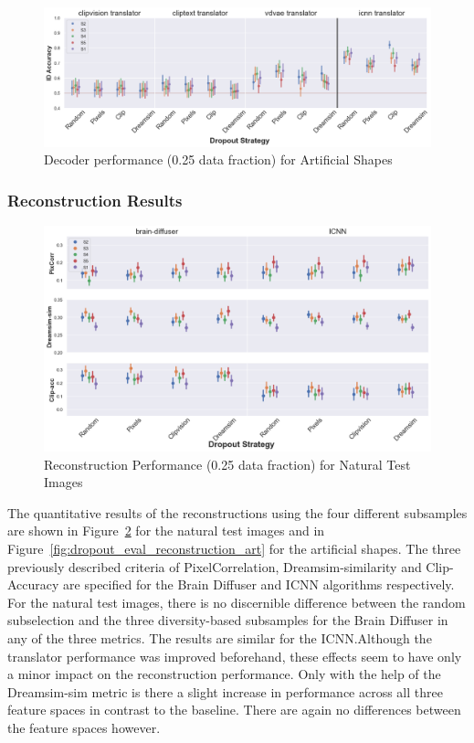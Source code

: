 \begin{figure}[ht]
  \centering
  \includegraphics[width=1\textwidth]{plots/dropout_eval_translator_art.png}
  \caption{Decoder performance (0.25 data fraction) for Artificial Shapes}\label{fig:dropout_eval_translator_art}
\end{figure}


\subsubsection{Reconstruction Results}

\begin{figure}[ht]
  \centering
  \includegraphics[width=1\textwidth]{plots/dropout_eval_reconstruction_test.png}
  \caption{Reconstruction Performance (0.25 data fraction) for Natural Test Images}\label{fig:dropout_eval_reconstruction_test}
\end{figure}

The quantitative results of the reconstructions using the four different subsamples are shown in Figure~\ref{fig:dropout_eval_reconstruction_test} for the natural test images and in Figure~\ref{fig:dropout_eval_reconstruction_art} for the artificial shapes. The three previously described criteria of PixelCorrelation, Dreamsim-similarity and Clip-Accuracy are specified for the Brain Diffuser and ICNN algorithms respectively. For the natural test images, there is no discernible difference between the random subselection and the three diversity-based subsamples for the Brain Diffuser in any of the three metrics. The results are similar for the ICNN.\@ Although the translator performance was improved beforehand, these effects seem to have only a minor impact on the reconstruction performance. Only with the help of the Dreamsim-sim metric is there a slight increase in performance across all three feature spaces in contrast to the baseline. There are again no differences between the feature spaces however.

